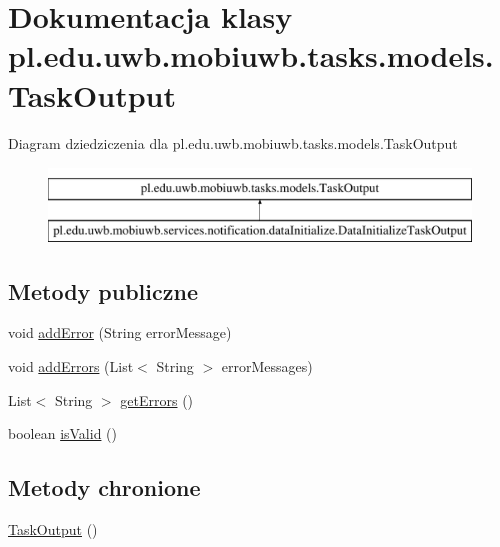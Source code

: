 \hypertarget{classpl_1_1edu_1_1uwb_1_1mobiuwb_1_1tasks_1_1models_1_1_task_output}{}\section{Dokumentacja klasy pl.\+edu.\+uwb.\+mobiuwb.\+tasks.\+models.\+Task\+Output}
\label{classpl_1_1edu_1_1uwb_1_1mobiuwb_1_1tasks_1_1models_1_1_task_output}
Diagram dziedziczenia dla pl.\+edu.\+uwb.\+mobiuwb.\+tasks.\+models.\+Task\+Output\begin{figure}[H]
\begin{center}
\leavevmode
\includegraphics[height=2.000000cm]{classpl_1_1edu_1_1uwb_1_1mobiuwb_1_1tasks_1_1models_1_1_task_output}
\end{center}
\end{figure}
\subsection*{Metody publiczne}
\begin{DoxyCompactItemize}
\item 
void \hyperlink{classpl_1_1edu_1_1uwb_1_1mobiuwb_1_1tasks_1_1models_1_1_task_output_a20d662d48c5ccc08468686cf2989679d}{add\+Error} (String error\+Message)
\item 
void \hyperlink{classpl_1_1edu_1_1uwb_1_1mobiuwb_1_1tasks_1_1models_1_1_task_output_af2584ddec74dde7aedc38e0602f5a377}{add\+Errors} (List$<$ String $>$ error\+Messages)
\item 
List$<$ String $>$ \hyperlink{classpl_1_1edu_1_1uwb_1_1mobiuwb_1_1tasks_1_1models_1_1_task_output_a6c8fbfa37a6b19fcbff9db8e78bd3e38}{get\+Errors} ()
\item 
boolean \hyperlink{classpl_1_1edu_1_1uwb_1_1mobiuwb_1_1tasks_1_1models_1_1_task_output_af6e1659037e3c4e13be957dcc71ae3f7}{is\+Valid} ()
\end{DoxyCompactItemize}
\subsection*{Metody chronione}
\begin{DoxyCompactItemize}
\item 
\hyperlink{classpl_1_1edu_1_1uwb_1_1mobiuwb_1_1tasks_1_1models_1_1_task_output_adec72024b981df30a37d16a90b1cfc89}{Task\+Output} ()
\end{DoxyCompactItemize}



